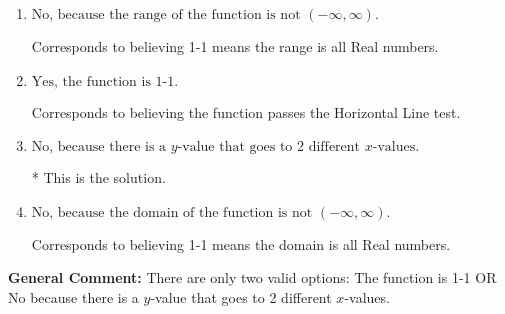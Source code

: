 \documentclass{extbook}[14pt]
\begin{document}
\begin{enumerate}
{\begin{enumerate}[label=\Alph*.]
Corresponds to the Vertical Line test, which checks if an expression is a function.
\item \( \text{No, because the range of the function is not $(-\infty, \infty)$.} \)

Corresponds to believing 1-1 means the range is all Real numbers.
\item \( \text{Yes, the function is 1-1.} \)

Corresponds to believing the function passes the Horizontal Line test.
\item \( \text{No, because there is a $y$-value that goes to 2 different $x$-values.} \)

* This is the solution.
\item \( \text{No, because the domain of the function is not $(-\infty, \infty)$.} \)

Corresponds to believing 1-1 means the domain is all Real numbers.
\end{enumerate}

\textbf{General Comment:} There are only two valid options: The function is 1-1 OR No because there is a $y$-value that goes to 2 different $x$-values.
}
\end{enumerate}
\end{document}
